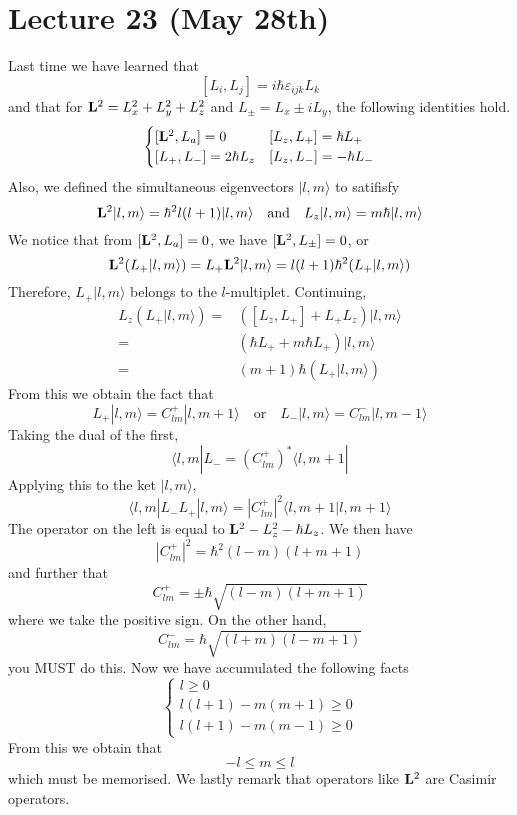 \section{Lecture 23 (May 28th)}
\begin{recall}
Last time we have learned that
\[[L_{i},L_{j}]=i\hbar \varepsilon _{ijk}L_{k}\]
and that for ${\bf L}^2=L_{x}^2+L_{y}^2+L_{z}^2$ and $L_{\pm}=L_{x}\pm iL_{y}$, the following identities hold.
\[\begin{cases}
[{\bf L}^2,L_{a}]=0&[L_{z},L_{+}]=\hbar L_{+}\\
[L_{+},L_{-}]=2\hbar L_{z}&[L_{z},L_{-}]=-\hbar L_{-}
\end{cases}\]
Also, we defined the simultaneous eigenvectors $|l,m\rangle $ to satifisfy
\[{\bf L}^2|l,m\rangle =\hbar ^2l(l+1)|l,m\rangle \quad\mathrm{and}\quad L_{z}|l,m\rangle =m\hbar |l,m\rangle \]
We notice that from $[{\bf L}^2,L_{a}]=0$, we have $[{\bf L}^2,L_{\pm}]=0$, or 
\[{\bf L}^2(L_{+}|l,m\rangle )=L_{+}{\bf L}^2|l,m\rangle =l(l+1)\hbar ^2(L_{+}|l,m\rangle )\]
Therefore, $L_{+}|l,m\rangle $ belongs to the $l$-multiplet. Continuing,
\begin{align*}
L_{z}(L_{+}|l,m\rangle )=&([L_{z},L_{+}]+L_{+}L_{z})|l,m\rangle\\=&(\hbar L_{+}+m\hbar L_{+})|l,m\rangle \\
=&(m+1)\hbar (L_{+}|l,m\rangle )
\end{align*}
From this we obtain the fact that
\[L_{+}|l,m\rangle =C_{lm}^{+}|l,m+1\rangle\quad\mathrm{or}\quad L_{-}|l,m\rangle =C^{-}_{lm}|l,m-1\rangle  \]
Taking the dual of the first, 
\[\langle l,m|L_{-}=(C^{+}_{lm})^{*}\langle l,m+1|\]
Applying this to the ket $|l,m\rangle $,
\[\langle l,m|L_{-}L_{+}|l,m\rangle =|C^{+}_{lm}|^2\langle l,m+1|l,m+1\rangle \]
The operator on the left is equal to ${\bf L}^2-L_{z}^2-\hbar L_{z}$. We then have
\[|C_{lm}^{+}|^2=\hbar ^2(l-m)(l+m+1)\]
and further that
\[C_{lm}^{+}=\pm\hbar \sqrt{(l-m)(l+m+1)}\]
where we take the positive sign. On the other hand,
\[C_{lm}^{-}=\hbar \sqrt{(l+m)(l-m+1)}\]
you MUST do this. Now we have accumulated the following facts
\[\begin{cases}
l\geq 0\\
l(l+1)-m(m+1)\geq 0\\
l(l+1)-m(m-1)\geq 0
\end{cases}\]
From this we obtain that
\[-l\leq m\leq l\]
which must be memorised. We lastly remark that operators like ${\bf L}^2$ are Casimir operators.
\end{recall}
\vspace{2ex}
